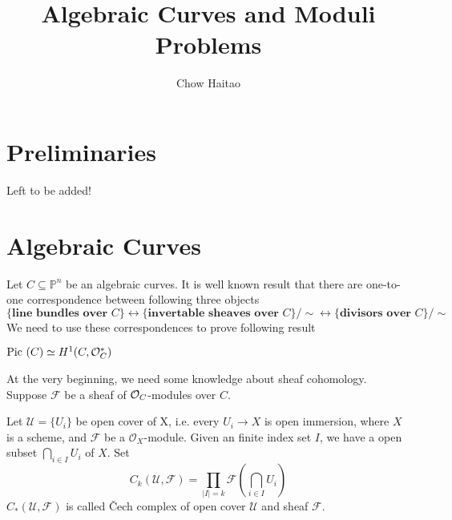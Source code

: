 \documentclass{amsart}
\title{Algebraic Curves and Moduli Problems}
\author{Chow Haitao}
\begin{document}
\maketitle
\section{Preliminaries}
Left to be added!
\section{Algebraic Curves}
Let $C \subseteq \mathbb{P}^n$ be an algebraic curves.
It is well known result that there are one-to-one correspondence between following three objects
\[
\{\textbf{line bundles over }C \} \longleftrightarrow \{\textbf{invertable sheaves over }C \}/\sim \longleftrightarrow \{\textbf{divisors over }C\}/\sim
\]
We need to use these correspondences to prove following result
\begin{secthm}
	$\text{Pic } (C) \simeq H^1 (C, \mathcal{O}_{C}^*)$
\end{secthm}
At the very beginning, we need some knowledge about sheaf cohomology.
Suppose $\mathcal{F}$ be a sheaf of $\mathcal{O}_{C}$-modules over $C$.
\begin{secdefn}
	Let $\mathcal{U}=\{U_i \}$ be open cover of X, i.e. every $U_i \rightarrow X$ is open immersion, where $X$ is a scheme, and $\mathcal{F}$ be a $\mathcal{O}_X$-module. Given an finite index set $I$, we have a open subset $\bigcap_{i \in I} U_i$ of $X$. Set $$C_k(\mathcal{U},\mathcal{F}) = \prod_{|I|=k}\mathcal{F}(\bigcap_{i \in I} U_i)$$
	$C_*(\mathcal{U},\mathcal{F})$ is called \v Cech complex of open cover $\mathcal{U}$ and sheaf $\mathcal{F}$.
\end{secdefn} 
\end{document}

